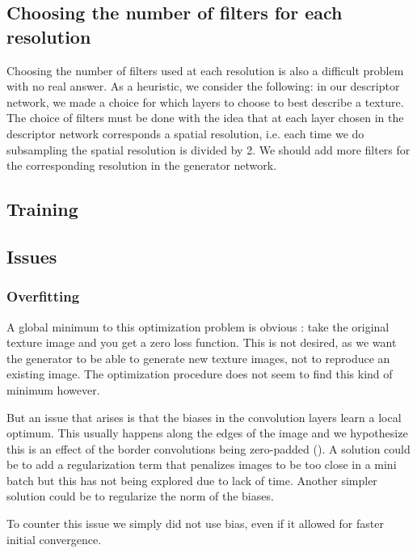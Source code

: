 \documentclass{article}
\begin{document}
\subsection{Choosing the number of filters for each resolution}

Choosing the number of filters used at each resolution is also a difficult problem with no real answer. As a heuristic, we consider the following: in our descriptor network, we made a choice for which layers to choose to best describe a texture. The choice of filters must be done with the idea that at each layer chosen in the descriptor network corresponds a spatial resolution, i.e. each time we do subsampling the spatial resolution is divided by 2. We should add more filters for the corresponding resolution in the generator network.

\subsection{Training}

\subsection{Issues}
\subsubsection{Overfitting}

A global minimum to this optimization problem is obvious : take the original texture image and you get a zero loss function. This is not desired, as we want the generator to be able to generate new texture images, not to reproduce an existing image. The optimization procedure does not seem to find this kind of minimum however.

But an issue that arises is that the biases in the convolution layers learn a local optimum. This usually happens along the edges of the image and we hypothesize this is an effect of the border convolutions being zero-padded (\label{fig:overfit}). A solution could be to add a regularization term that penalizes images to be too close in a mini batch but this has not being explored due to lack of time. Another simpler solution could be to regularize the norm of the biases.

To counter this issue we simply did not use bias, even if it allowed for faster initial convergence.
\end{document}
